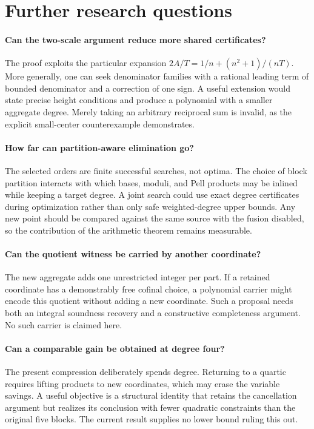\documentclass[10pt,letterpaper]{article}
\theoremstyle{remark}\newtheorem{remark}[theorem]{Remark}
\begin{document}
\section{Further research questions}

\paragraph{Can the two-scale argument reduce more shared certificates?}
The proof exploits the particular expansion
$2A/T=1/n+(n^2+1)/(nT)$. More generally, one can seek denominator
families with a rational leading term of bounded denominator and a
correction of one sign. A useful extension would state precise height
conditions and produce a polynomial with a smaller aggregate degree.
Merely taking an arbitrary reciprocal sum is invalid, as the explicit
small-center counterexample demonstrates.

\paragraph{How far can partition-aware elimination go?}
The selected orders are finite successful searches, not optima. The
choice of block partition interacts with which bases, moduli, and Pell
products may be inlined while keeping a target degree. A joint search
could use exact degree certificates during optimization rather than
only safe weighted-degree upper bounds. Any new point should be compared
against the same source with the fusion disabled, so the contribution
of the arithmetic theorem remains measurable.

\paragraph{Can the quotient witness be carried by another coordinate?}
The new aggregate adds one unrestricted integer per part. If a retained
coordinate has a demonstrably free cofinal choice, a polynomial carrier
might encode this quotient without adding a new coordinate. Such a
proposal needs both an integral soundness recovery and a constructive
completeness argument. No such carrier is claimed here.

\paragraph{Can a comparable gain be obtained at degree four?}
The present compression deliberately spends degree. Returning to a
quartic requires lifting products to new coordinates, which may erase
the variable savings. A useful objective is a structural identity that
retains the cancellation argument but realizes its conclusion with
fewer quadratic constraints than the original five blocks. The current
result supplies no lower bound ruling this out.
\end{document}
